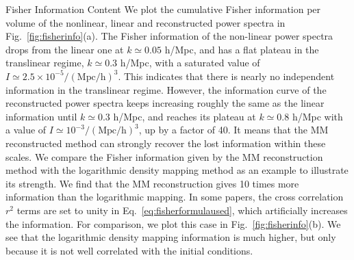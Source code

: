 \begin{section}{Fisher Information Content}
  We plot the cumulative Fisher information per volume of the
  nonlinear, linear and reconstructed power spectra in
  Fig.~\ref{fig:fisherinfo}(a). The Fisher information of the
  non-linear power spectra drops from the linear one at
  $k \simeq 0.05$ h/Mpc, and has a flat plateau in the translinear
  regime, $k\simeq 0.3$ h/Mpc, with a saturated value of
  $I \simeq 2.5 \times 10^{-5}/\mathrm{(Mpc/h)}^3$.  This indicates
  that there is nearly no independent information in the translinear
  regime.  However, the information curve of the reconstructed power
  spectra keeps increasing roughly the same as the linear information
  until $k\simeq 0.3$ h/Mpc, and reaches its plateau at $k\simeq 0.8$
  h/Mpc with a value of $I \simeq 10^{-3}/\mathrm{(Mpc/h)}^3$, up by a
  factor of 40.  It means that the MM reconstructed method can
  strongly recover the lost information within these scales.  We
  compare the Fisher information given by the MM reconstruction method
  with the logarithmic density mapping method \cite{bib:Mark2009} as
  an example to illustrate its strength.  We find that the MM
  reconstruction gives 10 times more information than the logarithmic
  mapping.  In some papers, the cross correlation $r^2$ terms are set
  to unity in Eq.~\ref{eq:fisherformulaused}, which artificially
  increases the information.  For comparison, we plot this case in
  Fig.~\ref{fig:fisherinfo}(b).  We see that the logarithmic density
  mapping information is much higher, but only because it is not well
  correlated with the initial conditions.


\end{section}
